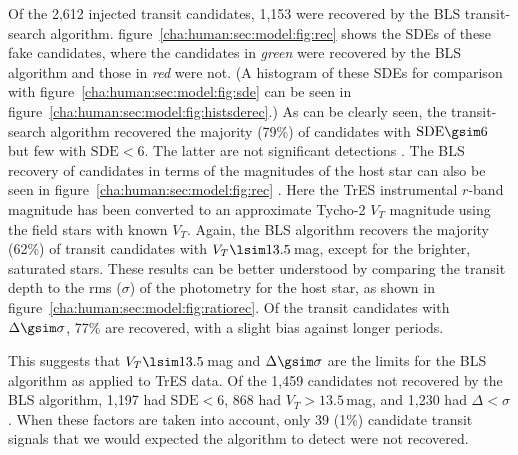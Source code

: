 Of the 2,612 injected transit candidates, 1,153 were recovered by the BLS transit-search algorithm.
figure~\ref{cha:human:sec:model:fig:rec} %
shows the SDEs of these fake candidates, where the candidates in {\it green} were recovered by the BLS algorithm and those in {\it red} were not.
(A histogram of these SDEs for comparison with figure~\ref{cha:human:sec:model:fig:sde} can be seen in figure~\ref{cha:human:sec:model:fig:histsderec}.)
As can be clearly seen, the transit-search algorithm recovered the majority (79\%) of candidates with $\mathrm{SDE} \gsim 6$ but few with $\mathrm{SDE} < 6$. The latter are not significant detections \citep[see][]{Kovacs_Zucker_Mazeh:aa:2002a}.
The BLS recovery of candidates in terms of the magnitudes of the host star can also be seen in figure~\ref{cha:human:sec:model:fig:rec}%
.
Here the TrES instrumental $r$-band magnitude has been converted to an approximate Tycho-2 \citep{Hog_Fabricius_Makarov:aa:2000a} $V_{T}$ magnitude using the field stars with known $V_{T}$.
Again, the BLS algorithm recovers the majority (62\%) of transit candidates with $V_{T}\lsim 13.5$\,mag, except for the brighter, saturated stars.
These results can be better understood by comparing the transit depth to the rms ($\sigma$) of the photometry for the host star, as shown in figure~\ref{cha:human:sec:model:fig:ratiorec}. Of the transit candidates with $\Delta \gsim \sigma$,  77\% are recovered, with a slight bias against longer periods.

This suggests that $V_{T}\lsim 13.5$\,mag and $\Delta \gsim \sigma$ are the limits for the BLS algorithm as applied to TrES data.
Of the 1,459 candidates not recovered by the BLS algorithm, 1,197 had $\mathrm{SDE} < 6$, 868 had $V_{T}> 13.5$\,mag, and 1,230 had $\Delta < \sigma$. When these factors are taken into account, only 39 (1\%) candidate transit signals that we would expected the algorithm to detect were not recovered.

